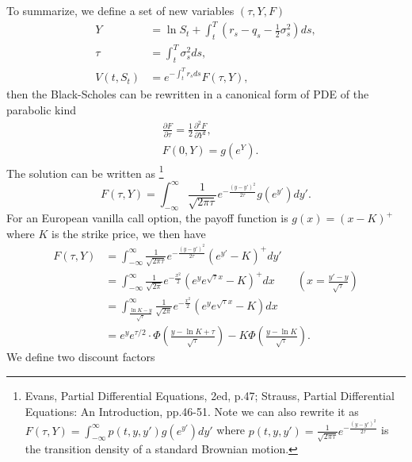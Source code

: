 To summarize, we define a set of new variables $(\tau, Y, F)$
\begin{align}
	Y &= \ln S_t + \int_t^T \left( r_s - q_s - \frac{1}{2} \sigma_s^2 \right) ds,
	\\
	\tau &= \int_t^T \sigma_s^2 ds, \\
	V(t,S_t) &= e^{- \int_t^T r_s ds } F(\tau, Y),
\end{align}
then the Black-Scholes can be rewritten in a canonical form of PDE of the
parabolic kind
\begin{align}
	& \frac{\partial F}{\partial \tau} 
	   = \frac{1}{2} \frac{\partial^2 F}{\partial Y^2}, \\
	& F(0,Y) = g(e^Y).
\end{align}
The solution can be written as 
\footnote{Evans, Partial Differential Equations, 2ed, p.47; Strauss, Partial
	Differential Equations: An Introduction, pp.46-51. Note we can also rewrite it
  as $F(\tau,Y)=\int_{-\infty}^{\infty} p(t,y,y') g(e^{y'}) dy'$ where
	$p(t,y,y')=\frac{1}{\sqrt{2\pi\tau}} e^{-\frac{(y-y')^2}{2\tau}}$ is the
  transition density of a standard Brownian motion.}
\begin{equation}
	F(\tau,Y) = \int_{-\infty}^{\infty} \frac{1}{\sqrt{2\pi\tau}} 
	            e^{-\frac{(y-y')^2}{2\tau}} g(e^{y'}) dy'.
\end{equation}
For an European vanilla call option, the payoff function is $g(x)=(x-K)^+$ 
where $K$ is the strike price, we then have
\begin{align*}
	F(\tau,Y) 
	  &= \int_{-\infty}^{\infty} 
  		 \frac{1}{\sqrt{2\pi\tau}} e^{-\frac{(y-y')^2}{2\tau}} (e^{y'}-K)^+ dy' \\
	  &= \int_{-\infty}^{\infty} 
			 \frac{1}{\sqrt{2\pi}} e^{-\frac{x^2}{2}} (e^y e^{\sqrt{\tau} x} -K)^+ dx
			 \qquad (x=\frac{y'-y}{\sqrt{\tau}}) \\
	 &= \int_{\frac{\ln K -y}{\sqrt{\tau}}}^{\infty} 
    	 \frac{1}{\sqrt{2\pi}} e^{-\frac{x^2}{2}} (e^y e^{\sqrt{\tau} x} -K) dx \\
	 &= e^y e^{\tau /2} \cdot \Phi \left(\frac{y-\ln K+\tau}{\sqrt{\tau}}\right)
		  - K \Phi \left( \frac{y-\ln K}{\sqrt{\tau}} \right).
\end{align*}
We define two discount factors
